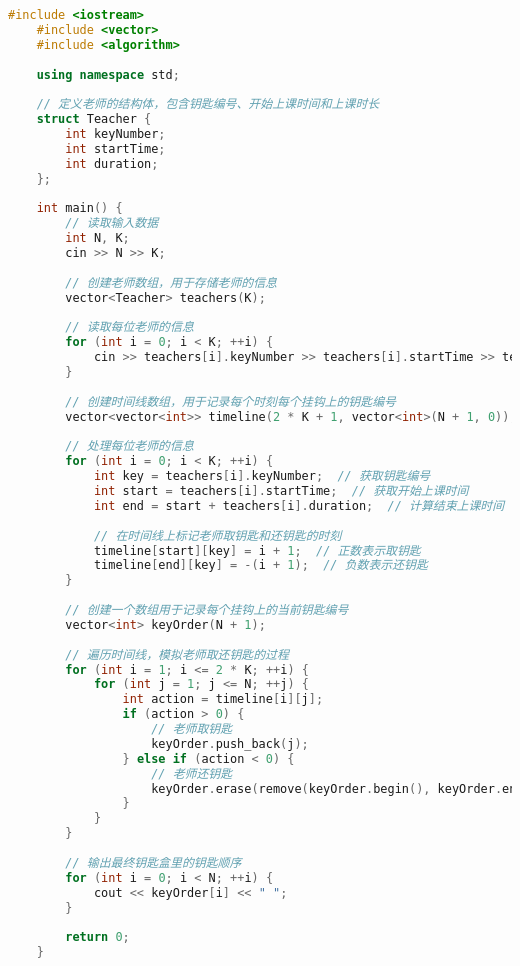 \begin{lstlisting}[language=C++]
    #include <iostream>
    #include <vector>
    #include <algorithm>
    
    using namespace std;
    
    // 定义老师的结构体，包含钥匙编号、开始上课时间和上课时长
    struct Teacher {
        int keyNumber;
        int startTime;
        int duration;
    };
    
    int main() {
        // 读取输入数据
        int N, K;
        cin >> N >> K;
    
        // 创建老师数组，用于存储老师的信息
        vector<Teacher> teachers(K);
    
        // 读取每位老师的信息
        for (int i = 0; i < K; ++i) {
            cin >> teachers[i].keyNumber >> teachers[i].startTime >> teachers[i].duration;
        }
    
        // 创建时间线数组，用于记录每个时刻每个挂钩上的钥匙编号
        vector<vector<int>> timeline(2 * K + 1, vector<int>(N + 1, 0));
    
        // 处理每位老师的信息
        for (int i = 0; i < K; ++i) {
            int key = teachers[i].keyNumber;  // 获取钥匙编号
            int start = teachers[i].startTime;  // 获取开始上课时间
            int end = start + teachers[i].duration;  // 计算结束上课时间
    
            // 在时间线上标记老师取钥匙和还钥匙的时刻
            timeline[start][key] = i + 1;  // 正数表示取钥匙
            timeline[end][key] = -(i + 1);  // 负数表示还钥匙
        }
    
        // 创建一个数组用于记录每个挂钩上的当前钥匙编号
        vector<int> keyOrder(N + 1);
    
        // 遍历时间线，模拟老师取还钥匙的过程
        for (int i = 1; i <= 2 * K; ++i) {
            for (int j = 1; j <= N; ++j) {
                int action = timeline[i][j];
                if (action > 0) {
                    // 老师取钥匙
                    keyOrder.push_back(j);
                } else if (action < 0) {
                    // 老师还钥匙
                    keyOrder.erase(remove(keyOrder.begin(), keyOrder.end(), -action), keyOrder.end());
                }
            }
        }
    
        // 输出最终钥匙盒里的钥匙顺序
        for (int i = 0; i < N; ++i) {
            cout << keyOrder[i] << " ";
        }
    
        return 0;
    }    
\end{lstlisting}

